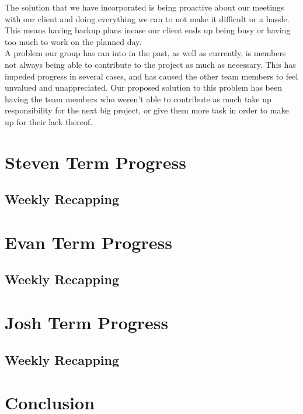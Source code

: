 \documentclass[onecolumn, draftclsnofoot,10pt, compsoc]{IEEEtran}
\begin{document}
\noindent The solution that we have incorporated is being proactive about our meetings with our client and
doing everything we can to not make it difficult or a hassle. This means having backup plans incase our 
client ends up being busy or having too much to work on the planned day.  \\

\noindent A problem our group has ran into in the past, as well as currently, is members not always being 
able to contribute to the project as much as necessary. This has impeded progress in several cases, and 
has caused the other team members to feel unvalued and unappreciated. Our proposed solution to this problem
has been having the team members who weren't able to contribute as much take up responsibility for the next
big project, or give them more task in order to make up for their lack thereof. \\

\newpage

\section{Steven Term Progress}

\subsection{Weekly Recapping}

\section{Evan Term Progress}

\subsection{Weekly Recapping}

\section{Josh Term Progress}
\subsection{Weekly Recapping}

\section{Conclusion}
\end{document}
